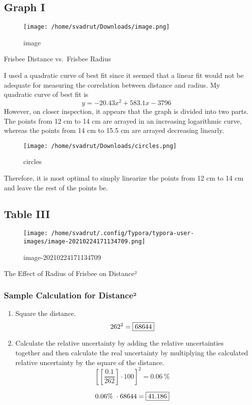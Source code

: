 \documentclass{article}
\begin{document}
\subsection{Graph I}\label{graph-i}

\begin{figure}
\centering
\texttt{[image: /home/svadrut/Downloads/image.png]}
\caption{image}
\end{figure}

Frisbee Distance vs.~Frisbee Radius

I used a quadratic curve of best fit since it seemed that a linear fit
would not be adequate for measuring the correlation between distance and
radius. My quadratic curve of best fit is \[
y = -20.43x^2+583.1x-3796
\] However, on closer inspection, it appears that the graph is divided
into two parts. The points from 12 cm to 14 cm are arrayed in an
increasing logarithmic curve, whereas the points from 14 cm to 15.5 cm
are arrayed decreasing linearly.

\begin{figure}
\centering
\texttt{[image: /home/svadrut/Downloads/circles.png]}
\caption{circles}
\end{figure}

Therefore, it is most optimal to simply linearize the points from 12 cm
to 14 cm and leave the rest of the points be.

\subsection{Table III}\label{table-iii}

\begin{figure}
\centering
\texttt{[image: /home/svadrut/.config/Typora/typora-user-images/image-20210224171134709.png]}
\caption{image-20210224171134709}
\end{figure}

The Effect of Radius of Frisbee on Distance²

\hypertarget{sample-calculation-for-distanceuxb2}{%
\subsubsection{Sample Calculation for
Distance²}\label{sample-calculation-for-distanceuxb2}}

\begin{enumerate}
\def\labelenumi{\arabic{enumi}.}
\item
  Square the distance. \[
  262^2 = \fbox{68644}
  \]
\item
  Calculate the relative uncertainty by adding the relative
  uncertainties together and then calculate the real uncertainty by
  multiplying the calculated relative uncertainty by the square of the
  distance. \[
  \left[ \left[ \frac{0.1}{262} \right]\cdot 100 \right]^2 = 0.06\ \%
  \]

  \[
  0.06\% \ \cdot 68644 = \fbox{41.186}
  \]
\end{enumerate}
\end{document}
